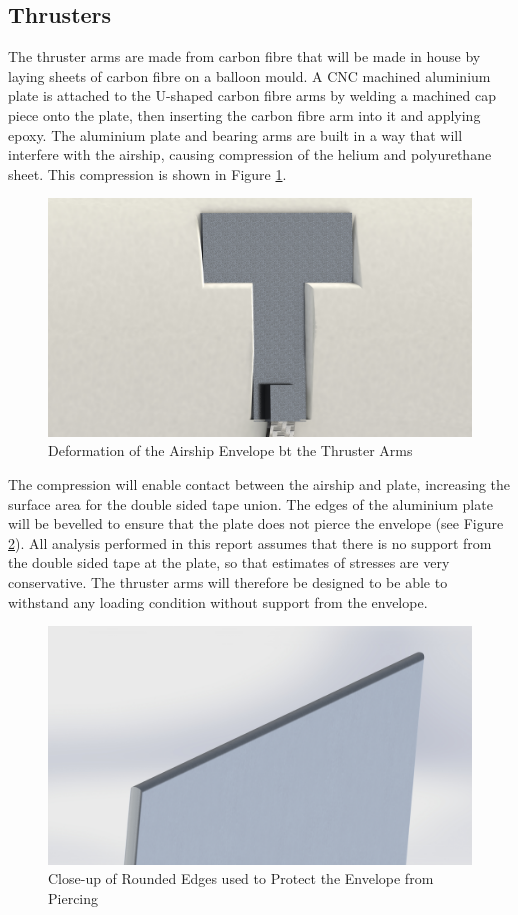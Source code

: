 \documentclass[../main.tex]{subfiles}
\begin{document}
\subsection{Thrusters}
The thruster arms are made from carbon fibre that will be made in house by laying sheets of carbon fibre on a balloon mould. A CNC machined aluminium plate is attached to the U-shaped carbon fibre arms by welding a machined cap piece onto the plate, then inserting the carbon fibre arm into it and applying epoxy. The aluminium plate and bearing arms are built in a way that will interfere with the airship, causing compression of the helium and polyurethane sheet. This compression is shown in Figure \ref{fig:envelopeDeformation}.

\begin{figure}[H]
	\centering
	\includegraphics[width=.8\linewidth]{img/design/thruster/envelopeDeformation.JPG}
	\caption{Deformation of the Airship Envelope bt the Thruster Arms}
	\label{fig:envelopeDeformation}
\end{figure}

The compression will enable contact between the airship and plate, increasing the surface area for the double sided tape union. The edges of the aluminium plate will be bevelled to ensure that the plate does not pierce the envelope (see Figure \ref{fig:roundedEdges}). All analysis performed in this report assumes that there is no support from the double sided tape at the plate, so that estimates of stresses are very conservative. The thruster arms will therefore be designed to be able to withstand any loading condition without support from the envelope.\\

\begin{figure}[H]
	\centering
	\includegraphics[width=.5\linewidth]{img/design/thruster/roundedEdges.JPG}
	\caption{Close-up of Rounded Edges used to Protect the Envelope from Piercing}
	\label{fig:roundedEdges}
\end{figure}
\end{document}
